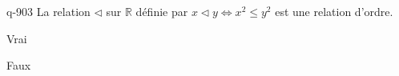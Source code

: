 \begin{truefalse}{q-903}
La relation $\triangleleft$ sur $\mathbb R$ définie par $x\triangleleft y \iff x^2\leq y^2$ est une relation d'ordre.
\item Vrai
\item* Faux
\end{truefalse}

